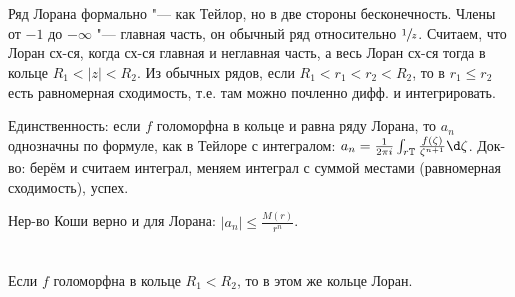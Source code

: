 \section{} %
	Ряд Лорана формально "--- как Тейлор, но в две стороны бесконечность.
	Члены от $-1$ до $-\infty$ "--- главная часть, он обычный ряд относительно $\sfrac{1}{z}$.
	Считаем, что Лоран сх-ся, когда сх-ся главная и неглавная часть, а весь Лоран сх-ся тогда в кольце $R_1<|z|<R_2$.
	Из обычных рядов, если $R_1<r_1<r_2<R_2$, то в $r_1 \le r_2$ есть равномерная сходимость, т.е.
	там можно почленно дифф. и интегрировать.

	Единственность: если $f$ голоморфна в кольце и равна ряду Лорана, то $a_n$ однозначны
	по формуле, как в Тейлоре с интегралом: $a_n=\frac{1}{2\pi i}\int_{r\mathbb{T}}\frac{f(\zeta)}{\zeta^{n+1}}\d \zeta$.
	Док-во: берём и считаем интеграл, меняем интеграл с суммой местами (равномерная сходимость), успех.

	Нер-во Коши верно и для Лорана: $|a_n|\le\frac{M(r)}{r^n}$.

\section{} %
	Если $f$ голоморфна в кольце $R_1 < R_2$, то в этом же кольце Лоран.
	\TODO

\section{} %
	\TODO

\section{} %
	\TODO

\section{} %
	\TODO

\section{} %
	\TODO

\section{} %
	\TODO

